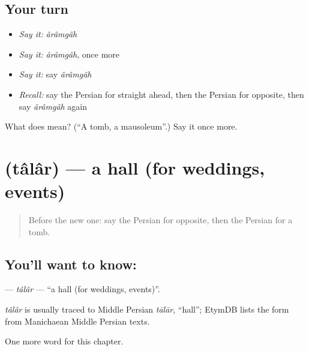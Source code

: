 \subsection*{Your turn}
\begin{itemize}
\raggedright
  \item \emph{Say it:} \emph{ârâmgâh}
  \item \emph{Say it:} \emph{ârâmgâh}, once more
  \item \emph{Say it:} say \emph{ârâmgâh}
  \item \emph{Recall:} say the Persian for straight ahead, then the Persian for opposite, then say \emph{ârâmgâh} again
\end{itemize}

\begin{tcolorbox}[breakable,colback=teal!4,colframe=teal!35!black,title={Before you move on}]
What does  mean? (\textquotedblleft{}A tomb, a mausoleum\textquotedblright{}.) Say it once more.
\end{tcolorbox}
\section[\texorpdfstring{\fa{تالار} (tâlâr)}{تالار (tâlâr)}]{ (tâlâr) — a hall (for weddings, events)}

\label{lesson:FA-C231-talar}



\begin{quote}
Before the new one: say the Persian for opposite, then the Persian for a tomb.
\end{quote}

\subsection*{You'll want to know: }
\textbf{} — \emph{tâlâr} — \textquotedblleft{}a hall (for weddings, events)\textquotedblright{}.

\begin{cousinweb}
\emph{tâlâr} is usually traced to Middle Persian \emph{tālār}, \textquotedblleft{}hall\textquotedblright{}; EtymDB lists the form from Manichaean Middle Persian texts.
\end{cousinweb}

\begin{grammarlens}[title={What you've built}]
One more word for this chapter.
\end{grammarlens}

